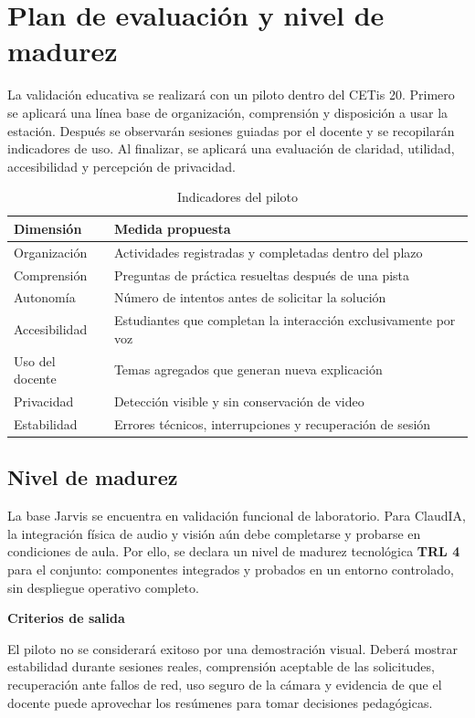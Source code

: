 \documentclass[letterpaper,11pt]{article}
\newcommand{\shortsection}[1]{\par\noindent\textbf{\fontsize{11}{19}\selectfont #1}\par}
\begin{document}
\section{Plan de evaluación y nivel de madurez}

La validación educativa se realizará con un piloto dentro del CETis 20. Primero se aplicará una línea base de organización, comprensión y disposición a usar la estación. Después se observarán sesiones guiadas por el docente y se recopilarán indicadores de uso. Al finalizar, se aplicará una evaluación de claridad, utilidad, accesibilidad y percepción de privacidad.

\begin{table}[H]
\centering
\caption{Indicadores del piloto}
\begin{tabularx}{\textwidth}{@{}>{\raggedright\arraybackslash}p{1.75in}>{\raggedright\arraybackslash}X@{}}
\toprule
\textbf{Dimensión} & \textbf{Medida propuesta} \\
\midrule
Organización & Actividades registradas y completadas dentro del plazo \\
Comprensión & Preguntas de práctica resueltas después de una pista \\
Autonomía & Número de intentos antes de solicitar la solución \\
Accesibilidad & Estudiantes que completan la interacción exclusivamente por voz \\
Uso del docente & Temas agregados que generan nueva explicación \\
Privacidad & Detección visible y sin conservación de video \\
Estabilidad & Errores técnicos, interrupciones y recuperación de sesión \\
\bottomrule
\end{tabularx}
\end{table}

\subsection*{Nivel de madurez}
La base Jarvis se encuentra en validación funcional de laboratorio. Para ClaudIA, la integración física de audio y visión aún debe completarse y probarse en condiciones de aula. Por ello, se declara un nivel de madurez tecnológica \textbf{TRL 4} para el conjunto: componentes integrados y probados en un entorno controlado, sin despliegue operativo completo.

\shortsection{Criterios de salida}
El piloto no se considerará exitoso por una demostración visual. Deberá mostrar estabilidad durante sesiones reales, comprensión aceptable de las solicitudes, recuperación ante fallos de red, uso seguro de la cámara y evidencia de que el docente puede aprovechar los resúmenes para tomar decisiones pedagógicas.
\end{document}

